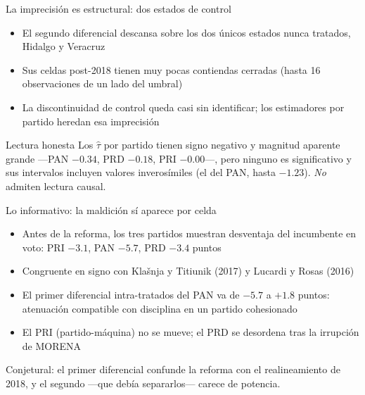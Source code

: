 \documentclass[
  aspectratio=43,        %
  t,                     %
  10pt                   %
]{beamer}
\begin{document}
\begin{frame}{La imprecisión es estructural: dos estados de control}

  \begin{itemize}
    \item El segundo diferencial descansa sobre los \textcolor{ITAMmaroon}{dos
          únicos} estados nunca tratados, Hidalgo y Veracruz
    \item Sus celdas post-2018 tienen muy pocas contiendas cerradas (hasta
          \textcolor{ITAMmaroon}{16} observaciones de un lado del umbral)
    \item La discontinuidad de control queda casi sin identificar; los
          estimadores por partido heredan esa imprecisión
  \end{itemize}

  \vspace{0.5em}
  \begin{alertblock}{Lectura honesta}
    \small Los $\hat{\tau}$ por partido tienen signo negativo y magnitud aparente
    grande —PAN $-0.34$, PRD $-0.18$, PRI $-0.00$—, pero ninguno es significativo
    y sus intervalos incluyen valores inverosímiles (el del PAN, hasta $-1.23$).
    \emph{No} admiten lectura causal.
  \end{alertblock}

\end{frame}

\begin{frame}{Lo informativo: la maldición sí aparece por celda}

  \begin{itemize}
    \item Antes de la reforma, los tres partidos muestran desventaja del
          incumbente en voto: PRI $-3.1$, PAN $-5.7$, PRD $-3.4$ puntos
    \item Congruente en signo con Klašnja y Titiunik (2017) y Lucardi y Rosas
          (2016)
    \item El primer diferencial intra-tratados del PAN va de
          \textcolor{ITAMgreen}{$-5.7$ a $+1.8$} puntos: atenuación compatible
          con disciplina en un partido cohesionado
    \item El PRI (partido-máquina) no se mueve; el PRD se desordena tras la
          irrupción de MORENA
  \end{itemize}

  \vspace{0.3em}
  {\footnotesize \textcolor{ITAMgray}{%
    Conjetural: el primer diferencial confunde la reforma con el realineamiento
    de 2018, y el segundo —que debía separarlos— carece de potencia.}}

\end{frame}
\end{document}
